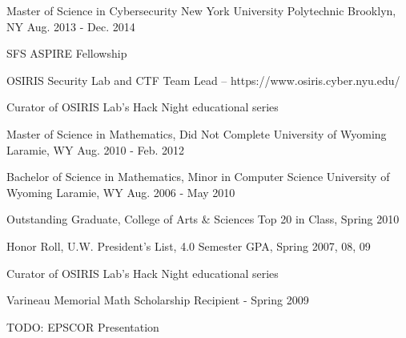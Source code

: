 


\begin{cventries}



{Master of Science in Cybersecurity} %
{New York University Polytechnic} %
{Brooklyn, NY} %
{Aug. 2013 - Dec. 2014} %
{
\begin{cvitems}
\item {SFS ASPIRE Fellowship}
\item {OSIRIS Security Lab and CTF Team Lead – https://www.osiris.cyber.nyu.edu/}
\item {Curator of OSIRIS Lab’s Hack Night educational series}
\end{cvitems}
}

{Master of Science in Mathematics, Did Not Complete} %
{University of Wyoming} %
{Laramie, WY} %
{Aug. 2010 - Feb. 2012} %
{
\begin{cvitems}
\end{cvitems}
}

{Bachelor of Science in Mathematics, Minor in Computer Science} %
{University of Wyoming} %
{Laramie, WY} %
{Aug. 2006 - May 2010} %
{
\begin{cvitems}
\item {Outstanding Graduate, College of Arts & Sciences Top 20 in Class, Spring 2010}
\item {Honor Roll, U.W. President’s List, 4.0 Semester GPA, Spring 2007, 08, 09}
\item {Curator of OSIRIS Lab’s Hack Night educational series}
\item {Varineau Memorial Math Scholarship Recipient - Spring 2009}
\item {TODO: EPSCOR Presentation}
\end{cvitems}
}


\end{cventries}